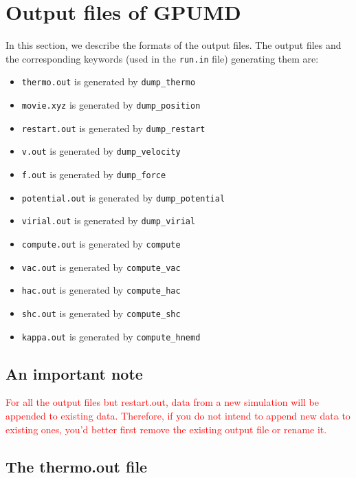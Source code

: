 \documentclass[12pt,a4paper]{report}
\begin{document}
\section{Output files of GPUMD}

In this section, we describe the formats of the output files. The output files and the corresponding keywords (used in the \verb"run.in" file) generating them are:
\begin{itemize}
\item \verb"thermo.out" is generated by \verb"dump_thermo"
\item \verb"movie.xyz" is generated by \verb"dump_position"
\item \verb"restart.out" is generated by \verb"dump_restart"
\item \verb"v.out" is generated by \verb"dump_velocity"
\item \verb"f.out" is generated by \verb"dump_force"
\item \verb"potential.out" is generated by \verb"dump_potential"
\item \verb"virial.out" is generated by \verb"dump_virial"
\item \verb"compute.out" is generated by \verb"compute"
\item \verb"vac.out" is generated by \verb"compute_vac"
\item \verb"hac.out" is generated by \verb"compute_hac"
\item \verb"shc.out" is generated by \verb"compute_shc"
\item \verb"kappa.out" is generated by \verb"compute_hnemd"
\end{itemize}


\subsection{An important note}

\textcolor{red}{For all the output files but restart.out, data from a new simulation will be appended to existing data. Therefore, if you do not intend to append new data to existing ones, you'd better first remove the existing output file or rename it.}

\subsection{The thermo.out file}
\end{document}
